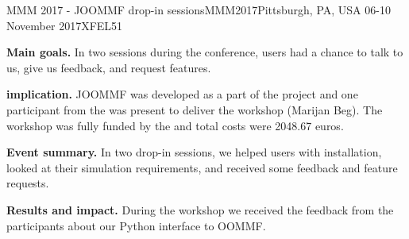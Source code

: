 \begin{event}{MMM 2017 - JOOMMF drop-in sessions}{MMM2017}{Pittsburgh, PA, USA 06-10 November 2017}{XFEL}{5}{1}{}

\textbf{Main goals.} In two sessions during the conference, users had a chance to talk to us, give us feedback, and request features.

\textbf{\ODK implication.} JOOMMF was developed as a part of the \ODK project and one participant from the \ODK was present to deliver the workshop (Marijan Beg). The workshop was fully funded by the \ODK and total costs were 2048.67 euros.

\textbf{Event summary.} In two drop-in sessions, we helped users with installation, looked at their simulation requirements, and received some feedback and feature requests.

\textbf{Results and impact.} During the workshop we received the feedback from the participants about our Python interface to OOMMF.

\end{event}
